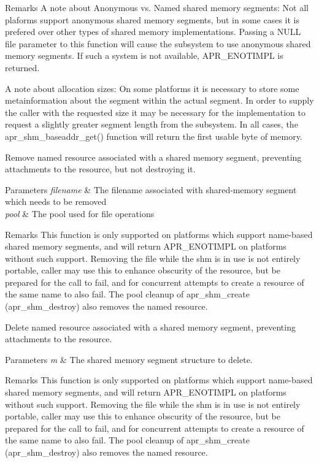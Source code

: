 \begin{DoxyRemark}{Remarks}
A note about Anonymous vs. Named shared memory segments\+: Not all plaforms support anonymous shared memory segments, but in some cases it is prefered over other types of shared memory implementations. Passing a N\+U\+LL \textquotesingle{}file\textquotesingle{} parameter to this function will cause the subsystem to use anonymous shared memory segments. If such a system is not available, A\+P\+R\+\_\+\+E\+N\+O\+T\+I\+M\+PL is returned. 

A note about allocation sizes\+: On some platforms it is necessary to store some metainformation about the segment within the actual segment. In order to supply the caller with the requested size it may be necessary for the implementation to request a slightly greater segment length from the subsystem. In all cases, the apr\+\_\+shm\+\_\+baseaddr\+\_\+get() function will return the first usable byte of memory.
\end{DoxyRemark}
Remove named resource associated with a shared memory segment, preventing attachments to the resource, but not destroying it. 
\begin{DoxyParams}{Parameters}
{\em filename} & The filename associated with shared-\/memory segment which needs to be removed \\
\hline
{\em pool} & The pool used for file operations \\
\hline
\end{DoxyParams}
\begin{DoxyRemark}{Remarks}
This function is only supported on platforms which support name-\/based shared memory segments, and will return A\+P\+R\+\_\+\+E\+N\+O\+T\+I\+M\+PL on platforms without such support. Removing the file while the shm is in use is not entirely portable, caller may use this to enhance obscurity of the resource, but be prepared for the call to fail, and for concurrent attempts to create a resource of the same name to also fail. The pool cleanup of apr\+\_\+shm\+\_\+create (apr\+\_\+shm\+\_\+destroy) also removes the named resource.
\end{DoxyRemark}
Delete named resource associated with a shared memory segment, preventing attachments to the resource. 
\begin{DoxyParams}{Parameters}
{\em m} & The shared memory segment structure to delete. \\
\hline
\end{DoxyParams}
\begin{DoxyRemark}{Remarks}
This function is only supported on platforms which support name-\/based shared memory segments, and will return A\+P\+R\+\_\+\+E\+N\+O\+T\+I\+M\+PL on platforms without such support. Removing the file while the shm is in use is not entirely portable, caller may use this to enhance obscurity of the resource, but be prepared for the call to fail, and for concurrent attempts to create a resource of the same name to also fail. The pool cleanup of apr\+\_\+shm\+\_\+create (apr\+\_\+shm\+\_\+destroy) also removes the named resource.
\end{DoxyRemark}
